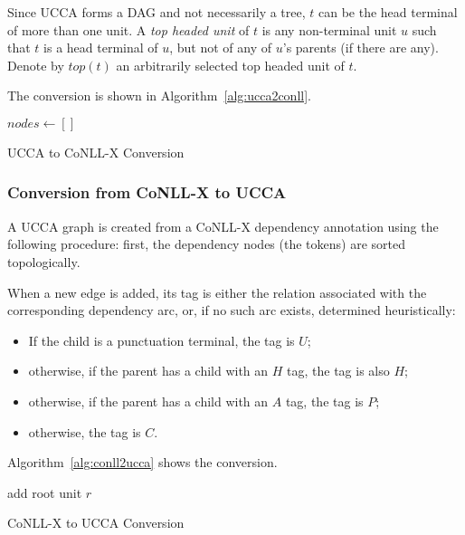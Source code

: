 \documentclass[11pt]{article}
\begin{document}
Since UCCA forms a DAG and not necessarily a tree, $t$ can be the head terminal of more than one unit. A \textit{top headed unit} of $t$ is any non-terminal unit $u$ such that $t$ is a head terminal of $u$, but not of any of $u$'s parents (if there are any). Denote by $top(t)$ an arbitrarily selected top headed unit of $t$.

The conversion is shown in Algorithm~\ref{alg:ucca2conll}.

\begin{algorithm}
 $nodes \leftarrow []$\;
 \caption{UCCA to CoNLL-X Conversion}
 \label{alg:ucca2conll}
\end{algorithm}

\subsubsection{Conversion from CoNLL-X to UCCA}

A UCCA graph is created from a CoNLL-X dependency annotation using the following procedure: first, the dependency nodes (the tokens) are sorted topologically.

When a new edge is added, its tag is either the relation associated with the corresponding dependency arc, or, if no such arc exists, determined heuristically:
\begin{itemize}
\item If the child is a punctuation terminal, the tag is $U$;
\item otherwise, if the parent has a child with an $H$ tag, the tag is also $H$;
\item otherwise, if the parent has a child with an $A$ tag, the tag is $P$;
\item otherwise, the tag is $C$.
\end{itemize}

Algorithm~\ref{alg:conll2ucca} shows the conversion.

\begin{algorithm}
 add root unit $r$\;
 \caption{CoNLL-X to UCCA Conversion}
 \label{alg:conll2ucca}
\end{algorithm}
\end{document}
